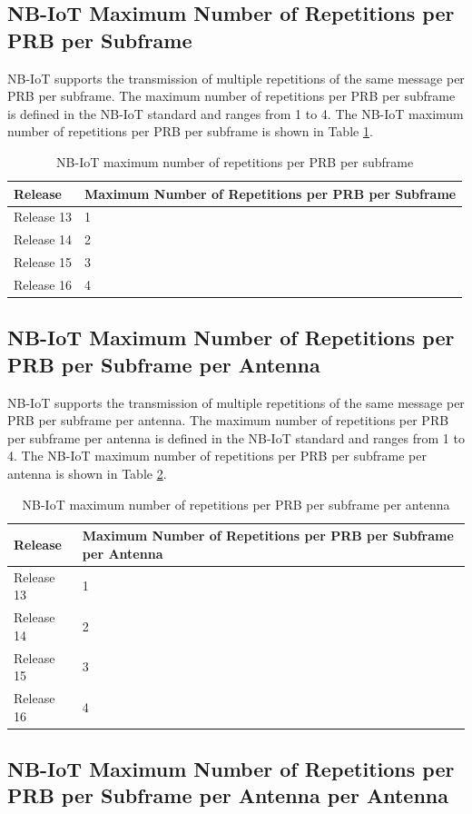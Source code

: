 \subsection{NB-IoT Maximum Number of Repetitions per PRB per Subframe}
NB-IoT supports the transmission of multiple repetitions of the same message per PRB per subframe. The maximum number of repetitions per PRB per subframe is defined in the NB-IoT standard and ranges from 1 to 4. The NB-IoT maximum number of repetitions per PRB per subframe is shown in Table \ref{tab:nb-iot-maximum-number-of-repetitions-per-prb-per-subframe}.
\begin{table}[ht]
    \centering
    \begin{tabular}{|l|l|}
        \hline
        \textbf{Release} & \textbf{Maximum Number of Repetitions per PRB per Subframe} \\ \hline
        Release 13 & 1 \\ \hline
        Release 14 & 2 \\ \hline
        Release 15 & 3 \\ \hline
        Release 16 & 4 \\ \hline
    \end{tabular}
    \caption{NB-IoT maximum number of repetitions per PRB per subframe \cite{nb-iot-maximum-number-of-repetitions-per-prb-per-subframe}}
    \label{tab:nb-iot-maximum-number-of-repetitions-per-prb-per-subframe}
\end{table}

\subsection{NB-IoT Maximum Number of Repetitions per PRB per Subframe per Antenna}
NB-IoT supports the transmission of multiple repetitions of the same message per PRB per subframe per antenna. The maximum number of repetitions per PRB per subframe per antenna is defined in the NB-IoT standard and ranges from 1 to 4. The NB-IoT maximum number of repetitions per PRB per subframe per antenna is shown in Table \ref{tab:nb-iot-maximum-number-of-repetitions-per-prb-per-subframe-per-antenna}.

\begin{table}[ht]
    \centering
    \begin{tabular}{|l|l|}
        \hline
        \textbf{Release} & \textbf{Maximum Number of Repetitions per PRB per Subframe per Antenna} \\ \hline
        Release 13 & 1 \\ \hline
        Release 14 & 2 \\ \hline
        Release 15 & 3 \\ \hline
        Release 16 & 4 \\ \hline
    \end{tabular}
    \caption{NB-IoT maximum number of repetitions per PRB per subframe per antenna \cite{nb-iot-maximum-number-of-repetitions-per-prb-per-subframe-per-antenna}}
    \label{tab:nb-iot-maximum-number-of-repetitions-per-prb-per-subframe-per-antenna}
\end{table}

\subsection{NB-IoT Maximum Number of Repetitions per PRB per Subframe per Antenna per Antenna}
